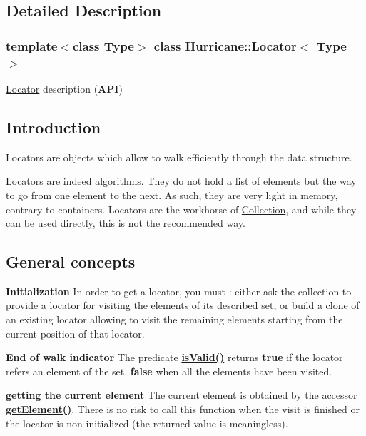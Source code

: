 \subsection{Detailed Description}
\subsubsection*{template$<$class Type$>$\newline
class Hurricane\+::\+Locator$<$ Type $>$}

\hyperlink{classHurricane_1_1Locator}{Locator} description ({\bfseries A\+PI}) 

\hypertarget{classHurricane_1_1Locator_secLocatorIntro}{}\subsection{Introduction}\label{classHurricane_1_1Locator_secLocatorIntro}
Locators are objects which allow to walk efficiently through the data structure.

Locators are indeed algorithms. They do not hold a list of elements but the way to go from one element to the next. As such, they are very light in memory, contrary to containers. Locators are the workhorse of \hyperlink{classHurricane_1_1Collection}{Collection}, and while they can be used directly, this is not the recommended way.\hypertarget{classHurricane_1_1Locator_secLocatorGeneralConcepts}{}\subsection{General concepts}\label{classHurricane_1_1Locator_secLocatorGeneralConcepts}
{\bfseries Initialization} In order to get a locator, you must \+: either ask the collection to provide a locator for visiting the elements of its described set, or build a clone of an existing locator allowing to visit the remaining elements starting from the current position of that locator.

{\bfseries End of walk indicator} The predicate {\bfseries \hyperlink{classHurricane_1_1Locator_abb6e5255372e22e31bf0a8e4cae93f87}{is\+Valid()}} returns {\bfseries true} if the locator refers an element of the set, {\bfseries false} when all the elements have been visited.

{\bfseries getting the current element} The current element is obtained by the accessor {\bfseries \hyperlink{classHurricane_1_1Locator_aa2202b4cf461a7c3b666da10bc96219f}{get\+Element()}}. There is no risk to call this function when the visit is finished or the locator is non initialized (the returned value is meaningless).

